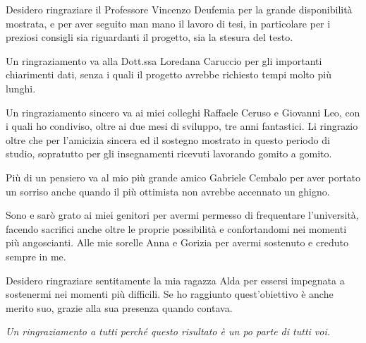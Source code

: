 Desidero ringraziare il Professore Vincenzo Deufemia per la grande disponibilità mostrata, e per aver seguito man mano il lavoro di tesi, in particolare per i preziosi consigli sia riguardanti il progetto, sia la stesura del testo. 

Un ringraziamento va alla Dott.ssa Loredana Caruccio per gli importanti chiarimenti dati, senza i quali il progetto avrebbe richiesto tempi molto più lunghi.

Un ringraziamento sincero va ai miei colleghi Raffaele Ceruso e Giovanni Leo, con i quali ho condiviso, oltre ai due mesi di sviluppo, tre anni fantastici. Li ringrazio oltre che per l'amicizia sincera ed il sostegno mostrato in questo periodo di studio, sopratutto per gli insegnamenti ricevuti lavorando gomito a gomito.

Più di un pensiero va al mio più grande amico Gabriele Cembalo per aver portato un sorriso anche quando il più ottimista non avrebbe accennato un ghigno.

Sono e sarò grato ai miei genitori per avermi permesso di frequentare l'università, facendo sacrifici anche oltre le proprie possibilità e confortandomi nei momenti più angoscianti. 
Alle mie sorelle Anna e Gorizia per avermi sostenuto e creduto sempre in me.

Desidero ringraziare sentitamente la mia ragazza Alda per essersi impegnata a sostenermi nei momenti più difficili. Se ho raggiunto quest'obiettivo è anche merito suo, grazie alla sua presenza quando contava.

\emph{Un ringraziamento a tutti perché questo risultato è un po parte di tutti voi.}